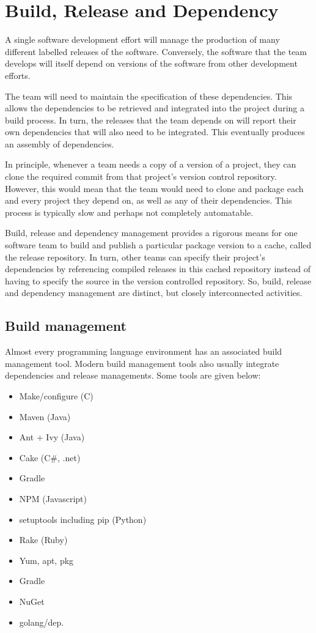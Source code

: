 \documentclass[a4paper, openany]{memoir}
\begin{document}
\chapter{Build, Release and Dependency}
A single software development effort will manage the production of many different labelled releases of the software. Conversely, the software that the team develops will itself depend on versions of the software from other development efforts. 

The team will need to maintain the specification of these dependencies. This allows the dependencies to be retrieved and integrated into the project during a build process. In turn, the releases that the team depends on will report their own dependencies that will also need to be integrated. This eventually produces an assembly of dependencies.

In principle, whenever a team needs a copy of a version of a project, they can clone the required commit from that project's version control repository. However, this would mean that the team would need to clone and package each and every project they depend on, as well as any of their dependencies. This process is typically slow and perhaps not completely automatable.

Build, release and dependency management provides a rigorous means for one software team to build and publish a particular package version to a cache, called the release repository. In turn, other teams can specify their project's dependencies by referencing compiled releases in this cached repository instead of having to specify the source in the version controlled repository. So, build, release and dependency management are distinct, but closely interconnected activities.

\section{Build management}
Almost every programming language environment has an associated build management tool. Modern build management tools also usually integrate dependencies and release managements. Some tools are given below:
\begin{itemize}
    \item Make/configure (C)
    \item Maven (Java)
    \item Ant + Ivy (Java)
    \item Cake (C\#, .net)
    \item Gradle
    \item NPM (Javascript)
    \item setuptools including pip (Python)
    \item Rake (Ruby)
    \item Yum, apt, pkg
    \item Gradle
    \item NuGet
    \item golang/dep.
\end{itemize}
\end{document}
